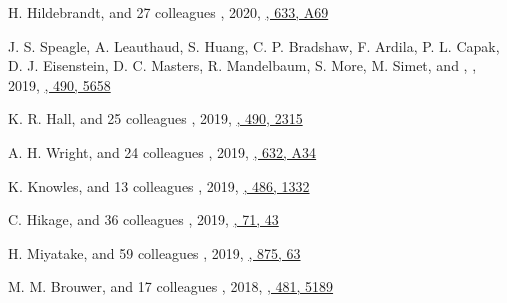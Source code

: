 \begin{etaremune}
\item
H. Hildebrandt, and 27 colleagues
,
2020, \href{https://ui.adsabs.harvard.edu/abs/2020A&A...633A..69H}{\aap, 633, A69}

\item
J. S. Speagle, A. Leauthaud, S. Huang, C. P. Bradshaw, F. Ardila, P. L. Capak, D. J. Eisenstein, D. C. Masters, R. Mandelbaum, S. More, M. Simet, and \myself,
,
2019, \href{https://ui.adsabs.harvard.edu/abs/2019MNRAS.490.5658S}{\mnras, 490, 5658}

\item
K. R. Hall, and 25 colleagues
,
2019, \href{https://ui.adsabs.harvard.edu/abs/2019MNRAS.490.2315H}{\mnras, 490, 2315}

\item
A. H. Wright, and 24 colleagues
,
2019, \href{https://ui.adsabs.harvard.edu/abs/2019A&A...632A..34W}{\aap, 632, A34}

\item
K. Knowles, and 13 colleagues
,
2019, \href{https://ui.adsabs.harvard.edu/abs/2019MNRAS.486.1332K}{\mnras, 486, 1332}

\item
C. Hikage, and 36 colleagues
,
2019, \href{https://ui.adsabs.harvard.edu/abs/2019PASJ...71...43H}{\pasj, 71, 43}

\item
H. Miyatake, and 59 colleagues
,
2019, \href{https://ui.adsabs.harvard.edu/abs/2019ApJ...875...63M}{\apj, 875, 63}

\item
M. M. Brouwer, and 17 colleagues
,
2018, \href{https://ui.adsabs.harvard.edu/abs/2018MNRAS.481.5189B}{\mnras, 481, 5189}


\end{etaremune}
